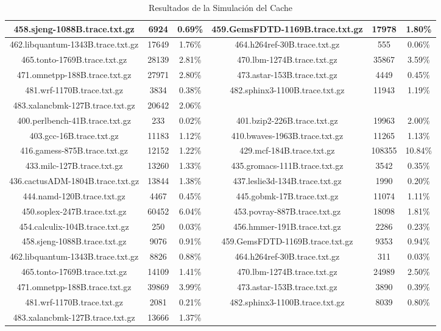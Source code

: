 \begin{table}[H]
\begin{tabular}{|c|c|c|c|c|c|}
458.sjeng-1088B.trace.txt.gz & 6924 & 0.69\% & 459.GemsFDTD-1169B.trace.txt.gz & 17978 & 1.80\% \\\hline
462.libquantum-1343B.trace.txt.gz & 17649 & 1.76\% & 464.h264ref-30B.trace.txt.gz & 555 & 0.06\% \\\hline
465.tonto-1769B.trace.txt.gz & 28139 & 2.81\% & 470.lbm-1274B.trace.txt.gz & 35867 & 3.59\% \\\hline
471.omnetpp-188B.trace.txt.gz & 27971 & 2.80\% & 473.astar-153B.trace.txt.gz & 4449 & 0.45\% \\\hline
481.wrf-1170B.trace.txt.gz & 3834 & 0.38\% & 482.sphinx3-1100B.trace.txt.gz & 11943 & 1.19\% \\\hline
483.xalancbmk-127B.trace.txt.gz & 20642 & 2.06\% & & & &  \\\hline
400.perlbench-41B.trace.txt.gz & 233 & 0.02\% & 401.bzip2-226B.trace.txt.gz & 19963 & 2.00\% \\\hline
403.gcc-16B.trace.txt.gz & 11183 & 1.12\% & 410.bwaves-1963B.trace.txt.gz & 11265 & 1.13\% \\\hline
416.gamess-875B.trace.txt.gz & 12152 & 1.22\% & 429.mcf-184B.trace.txt.gz & 108355 & 10.84\% \\\hline
433.milc-127B.trace.txt.gz & 13260 & 1.33\% & 435.gromacs-111B.trace.txt.gz & 3542 & 0.35\% \\\hline
436.cactusADM-1804B.trace.txt.gz & 13844 & 1.38\% & 437.leslie3d-134B.trace.txt.gz & 1990 & 0.20\% \\\hline
444.namd-120B.trace.txt.gz & 4467 & 0.45\% & 445.gobmk-17B.trace.txt.gz & 11074 & 1.11\% \\\hline
450.soplex-247B.trace.txt.gz & 60452 & 6.04\% & 453.povray-887B.trace.txt.gz & 18098 & 1.81\% \\\hline
454.calculix-104B.trace.txt.gz & 250 & 0.03\% & 456.hmmer-191B.trace.txt.gz & 2286 & 0.23\% \\\hline
458.sjeng-1088B.trace.txt.gz & 9076 & 0.91\% & 459.GemsFDTD-1169B.trace.txt.gz & 9353 & 0.94\% \\\hline
462.libquantum-1343B.trace.txt.gz & 8826 & 0.88\% & 464.h264ref-30B.trace.txt.gz & 311 & 0.03\% \\\hline
465.tonto-1769B.trace.txt.gz & 14109 & 1.41\% & 470.lbm-1274B.trace.txt.gz & 24989 & 2.50\% \\\hline
471.omnetpp-188B.trace.txt.gz & 39869 & 3.99\% & 473.astar-153B.trace.txt.gz & 3890 & 0.39\% \\\hline
481.wrf-1170B.trace.txt.gz & 2081 & 0.21\% & 482.sphinx3-1100B.trace.txt.gz & 8039 & 0.80\% \\\hline
483.xalancbmk-127B.trace.txt.gz & 13666 & 1.37\% & & & &  \\\hline
\hline
\end{tabular}
\caption{Resultados de la Simulación del Cache}
\label{tab:cache_results}
\end{table}